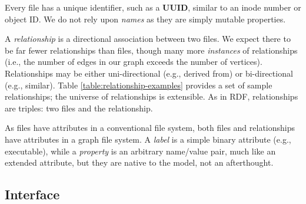 

\begin{comment}
Our relationship-centric file system consists of a \textit{union} of distinct
name spaces, which permits a name space that is not
fully connected, yet can still be merged via the existing union model. This permits an
application to have a private name space for files,
similar to both CAP and Plan 9~\cite{needham1977cap,pike1992use}.  Isolation also
enhances security, e.g., the POSIX \textbf{mkstemp} function, which was introduced to
address the need of applications for temporary files not visible to other applications.
Such namespaces are like unlinked but open files in UNIX, where such files are
reclaimed when the process terminates.  By creating a process private ephemeral namespace
we augment the file system's ability to provide enhanced isolation.
\end{comment}

Every file has a unique identifier, such as a \textbf{UUID}, similar to
an inode number or object ID.
We do not rely upon \textit{names}
as they are simply mutable properties.



A \textit{relationship} is a directional association between two files.  We expect there
to be far fewer relationships than files, though many more \textit{instances} of
relationships (i.e., the number of edges in our graph exceeds the number of vertices).
Relationships may be either uni-directional (e.g., derived from) or
bi-directional (e.g., similar).
Table \ref{table:relationship-examples}
provides a set of sample relationships; the universe of relationships
is extensible.
As in RDF, relationships are triples: two files and the relationship.

As files have attributes in a conventional file system, both files and
relationships have attributes in a graph file system.
A \textit{label} is a simple binary attribute (e.g., executable),
while a \textit{property} is an arbitrary name/value pair, much like
an extended attribute, but they are native to the model, not
an afterthought.


\subsection{Interface}\label{sec:graphfs:interface}

